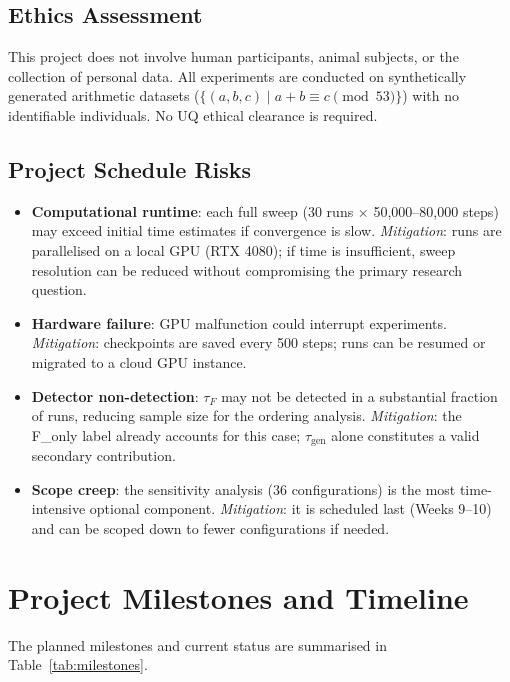 \documentclass[12pt,openany,a4paper]{book}
\newcommand{\tab}[1] {Table~\ref{#1}}
\newcommand{\taug}{\tau_{\mathrm{gen}}}
\newcommand{\tauf}{\tau_{F}}
\begin{document}
\subsection{Ethics Assessment}

This project does not involve human participants, animal subjects,
or the collection of personal data.
All experiments are conducted on synthetically generated arithmetic
datasets ($\{(a,b,c) \mid a+b \equiv c \pmod{53}\}$) with no
identifiable individuals.
No UQ ethical clearance is required.

\subsection{Project Schedule Risks}

\begin{itemize}
  \item \textbf{Computational runtime}: each full sweep (30 runs
    $\times$ 50{,}000--80{,}000 steps) may exceed initial time
    estimates if convergence is slow.
    \textit{Mitigation}: runs are parallelised on a local GPU (RTX 4080);
    if time is insufficient, sweep resolution can be reduced without
    compromising the primary research question.
  \item \textbf{Hardware failure}: GPU malfunction could interrupt
    experiments.
    \textit{Mitigation}: checkpoints are saved every 500 steps; runs
    can be resumed or migrated to a cloud GPU instance.
  \item \textbf{Detector non-detection}: $\tauf$ may not be detected
    in a substantial fraction of runs, reducing sample size for the
    ordering analysis.
    \textit{Mitigation}: the F\_only label already accounts for this
    case; $\taug$ alone constitutes a valid secondary contribution.
  \item \textbf{Scope creep}: the sensitivity analysis (36 configurations)
    is the most time-intensive optional component.
    \textit{Mitigation}: it is scheduled last (Weeks 9--10) and can
    be scoped down to fewer configurations if needed.
\end{itemize}

\section{Project Milestones and Timeline}

The planned milestones and current status are summarised in \tab{tab:milestones}.
\end{document}
